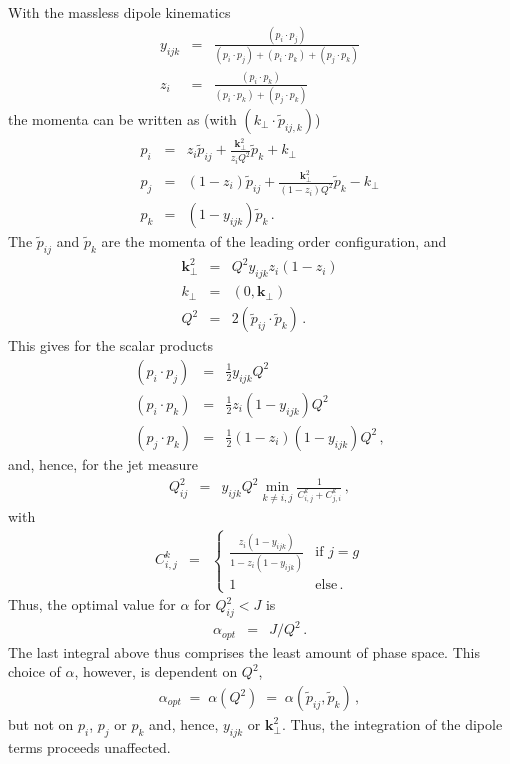 \documentclass[a4paper,10pt]{scrartcl}
\begin{document}
With the massless dipole kinematics
\begin{eqnarray}
 y_{ijk}
& = & \frac{(p_i\cdot p_j)}{(p_i\cdot p_j)+(p_i\cdot p_k)+(p_j\cdot p_k)} \\
 z_{i}
& = & \frac{(p_i\cdot p_k)}{(p_i\cdot p_k)+(p_j\cdot p_k)}
\end{eqnarray}
the momenta can be written as (with $(k_\perp\cdot\tilde{p}_{ij,k})$)
\begin{eqnarray}
 p_i
& = & z_i \tilde{p}_{ij} + \frac{\mathbf{k}_\perp^2}{z_i Q^2} \tilde{p}_k + k_\perp \\
 p_j
& = & (1-z_i) \tilde{p}_{ij} + \frac{\mathbf{k}_\perp^2}{(1-z_i) Q^2} \tilde{p}_k - k_\perp \\
 p_k
& = & (1-y_{ijk}) \tilde{p}_k \,.
\end{eqnarray}
The $\tilde{p}_{ij}$ and $\tilde{p}_k$ are the momenta of the leading
order configuration, and
\begin{eqnarray}
 \mathbf{k}_\perp^2
& = & Q^2 y_{ijk} z_i(1-z_i) \\
 k_\perp
& = & (0,\mathbf{k}_\perp) \\
 Q^2
& = & 2(\tilde{p}_{ij}\cdot \tilde{p}_k) \,.
\end{eqnarray}
This gives for the scalar products
\begin{eqnarray}
 (p_i\cdot p_j)
& = & \tfrac{1}{2} y_{ijk} Q^2 \\
 (p_i\cdot p_k)
& = & \tfrac{1}{2} z_i(1-y_{ijk}) Q^2 \\
 (p_j\cdot p_k)
& = & \tfrac{1}{2} (1-z_i)(1-y_{ijk}) Q^2 \,,
\end{eqnarray}
and, hence, for the jet measure
\begin{eqnarray}
 Q_{ij}^2
& = & y_{ijk} Q^2 \min\limits_{k\neq i,j}\frac{1}{C_{i,j}^k+C_{j,i}^k} \,,
\end{eqnarray}
with
\begin{eqnarray}
 C_{i,j}^k
& = & \left\{\begin{array}{cc}
              \frac{z_i(1-y_{ijk})}{1-z_i(1-y_{ijk})} & \mbox{if } j=g \\ 
              1 & \mbox{else}\,.
             \end{array}\right.
\end{eqnarray}
Thus, the optimal value for $\alpha$ for $Q_{ij}^2 < J$ is
\begin{eqnarray}\label{Eq:alpha_opt}
 \alpha_{opt} & = & J/Q^2 \,.
\end{eqnarray}
The last integral above thus comprises the least amount of phase space.
This choice of $\alpha$, however, is dependent on $Q^2$,
\begin{eqnarray}
 \alpha_{opt} \; = \; \alpha(Q^2) \; = \; \alpha(\tilde{p}_{ij},\tilde{p}_k) \,,
\end{eqnarray}
but not on $p_i$, $p_j$ or $p_k$ and, hence, $y_{ijk}$ or $\mathbf{k}_\perp^2$. 
Thus, the integration of the dipole terms proceeds unaffected.
\end{document}
